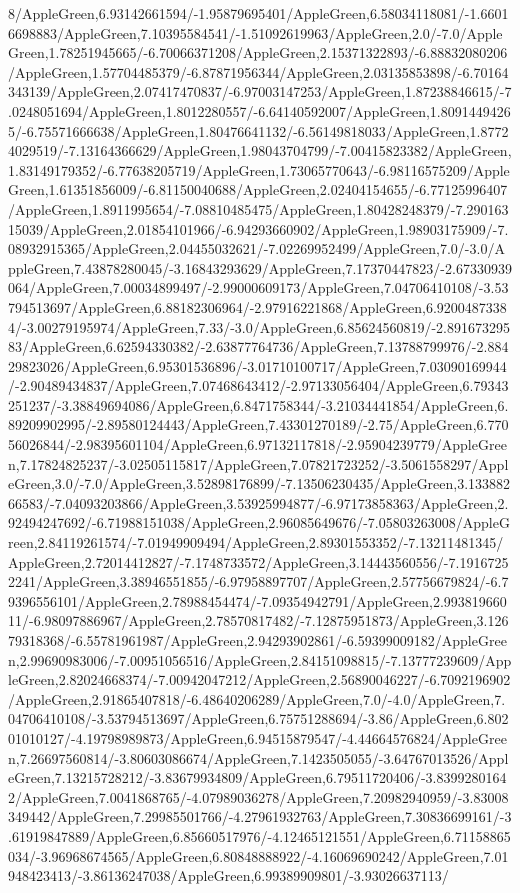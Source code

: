 {\begin{tikzternal}
8/AppleGreen,6.93142661594/-1.95879695401/AppleGreen,6.58034118081/-1.66016698883/AppleGreen,7.10395584541/-1.51092619963/AppleGreen,2.0/-7.0/AppleGreen,1.78251945665/-6.70066371208/AppleGreen,2.15371322893/-6.88832080206/AppleGreen,1.57704485379/-6.87871956344/AppleGreen,2.03135853898/-6.70164343139/AppleGreen,2.07417470837/-6.97003147253/AppleGreen,1.87238846615/-7.0248051694/AppleGreen,1.8012280557/-6.64140592007/AppleGreen,1.80914494265/-6.75571666638/AppleGreen,1.80476641132/-6.56149818033/AppleGreen,1.87724029519/-7.13164366629/AppleGreen,1.98043704799/-7.00415823382/AppleGreen,1.83149179352/-6.77638205719/AppleGreen,1.73065770643/-6.98116575209/AppleGreen,1.61351856009/-6.81150040688/AppleGreen,2.02404154655/-6.77125996407/AppleGreen,1.8911995654/-7.08810485475/AppleGreen,1.80428248379/-7.29016315039/AppleGreen,2.01854101966/-6.94293660902/AppleGreen,1.98903175909/-7.08932915365/AppleGreen,2.04455032621/-7.02269952499/AppleGreen,7.0/-3.0/AppleGreen,7.43878280045/-3.16843293629/AppleGreen,7.17370447823/-2.67330939064/AppleGreen,7.00034899497/-2.99000609173/AppleGreen,7.04706410108/-3.53794513697/AppleGreen,6.88182306964/-2.97916221868/AppleGreen,6.92004873384/-3.00279195974/AppleGreen,7.33/-3.0/AppleGreen,6.85624560819/-2.89167329583/AppleGreen,6.62594330382/-2.63877764736/AppleGreen,7.13788799976/-2.88429823026/AppleGreen,6.95301536896/-3.01710100717/AppleGreen,7.03090169944/-2.90489434837/AppleGreen,7.07468643412/-2.97133056404/AppleGreen,6.79343251237/-3.38849694086/AppleGreen,6.8471758344/-3.21034441854/AppleGreen,6.89209902995/-2.89580124443/AppleGreen,7.43301270189/-2.75/AppleGreen,6.77056026844/-2.98395601104/AppleGreen,6.97132117818/-2.95904239779/AppleGreen,7.17824825237/-3.02505115817/AppleGreen,7.07821723252/-3.5061558297/AppleGreen,3.0/-7.0/AppleGreen,3.52898176899/-7.13506230435/AppleGreen,3.13388266583/-7.04093203866/AppleGreen,3.53925994877/-6.97173858363/AppleGreen,2.92494247692/-6.71988151038/AppleGreen,2.96085649676/-7.05803263008/AppleGreen,2.84119261574/-7.01949909494/AppleGreen,2.89301553352/-7.13211481345/AppleGreen,2.72014412827/-7.1748733572/AppleGreen,3.14443560556/-7.19167252241/AppleGreen,3.38946551855/-6.97958897707/AppleGreen,2.57756679824/-6.79396556101/AppleGreen,2.78988454474/-7.09354942791/AppleGreen,2.99381966011/-6.98097886967/AppleGreen,2.78570817482/-7.12875951873/AppleGreen,3.12679318368/-6.55781961987/AppleGreen,2.94293902861/-6.59399009182/AppleGreen,2.99690983006/-7.00951056516/AppleGreen,2.84151098815/-7.13777239609/AppleGreen,2.82024668374/-7.00942047212/AppleGreen,2.56890046227/-6.7092196902/AppleGreen,2.91865407818/-6.48640206289/AppleGreen,7.0/-4.0/AppleGreen,7.04706410108/-3.53794513697/AppleGreen,6.75751288694/-3.86/AppleGreen,6.80201010127/-4.19798989873/AppleGreen,6.94515879547/-4.44664576824/AppleGreen,7.26697560814/-3.80603086674/AppleGreen,7.1423505055/-3.64767013526/AppleGreen,7.13215728212/-3.83679934809/AppleGreen,6.79511720406/-3.83992801642/AppleGreen,7.0041868765/-4.07989036278/AppleGreen,7.20982940959/-3.83008349442/AppleGreen,7.29985501766/-4.27961932763/AppleGreen,7.30836699161/-3.61919847889/AppleGreen,6.85660517976/-4.12465121551/AppleGreen,6.71158865034/-3.96968674565/AppleGreen,6.80848888922/-4.16069690242/AppleGreen,7.01948423413/-3.86136247038/AppleGreen,6.99389909801/-3.93026637113/
\end{tikzternal}}
